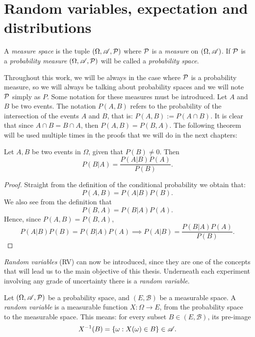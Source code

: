 


\section{Random variables, expectation and distributions}

\begin{ndef}
A \emph{measure space} is the tuple $(\Omega, \mathscr{A},\mathcal{P})$ where $\mathcal{P}$ is a \emph{measure} on $(\Omega, \mathscr{A})$. If $\mathcal{P}$ is a \emph{probability measure} $(\Omega,\mathscr{A},\mathcal{P})$ will be called a \emph{probability space}.
\end{ndef}

Throughout this work, we will be always in the case where $\mathcal{P}$ is a probability measure, so we will always be talking about probability spaces and we will note $\mathcal{P}$ simply as $P$. Some notation for these measures must be introduced. Let $A$ and $B$ be two events.
The notation $P(A,B)$ refers to the probability of the intersection of the events $A$ and $B$, that is: $P(A,B) := P(A\cap B)$.
 It is clear that since $A \cap B = B \cap A$, then $P(A,B) = P(B,A)$. The following theorem will be used multiple times in the proofs that we will do in the next chapters:

\begin{nth}
Let $A,B$ be two events in $\Omega$, given that $P(B) \neq 0$. Then
$$
P(B|A) = \frac{P(A|B) P(A)}{P(B)}.
$$
\end{nth}
\begin{proof}
Straight from the definition of the conditional probability we obtain that:
$$
P(A,B) = P(A|B)P(B).
$$
We also see from the definition that
$$
P(B,A) = P(B|A)P(A).
$$
Hence, since $P(A,B) = P(B,A)$,
$$
P(A|B)P(B) = P(B|A)P(A) \implies P(A|B) = \frac{P(B|A)P(A)}{P(B)}.
$$
\end{proof}

\emph{Random variables} (RV) can now be introduced, since they are one of the concepts that will lead us to the main objective of this thesis. Underneath each experiment involving any grade of uncertainty there is a \emph{random variable}.

\begin{ndef}
Let $(\Omega,\mathscr{A},\mathcal{P})$ be a probability space, and $(E,\mathcal B)$ be a measurable space. 
A \emph{random variable} is a measurable function $X: \Omega \to E$, from the probability space to the measurable space. This means: for every subset $B \in (E,\mathcal B)$, its pre-image
$$
X^{-1}(B) = \{\omega : X(\omega) \in B\} \in \mathscr{A} .
$$
\end{ndef}



